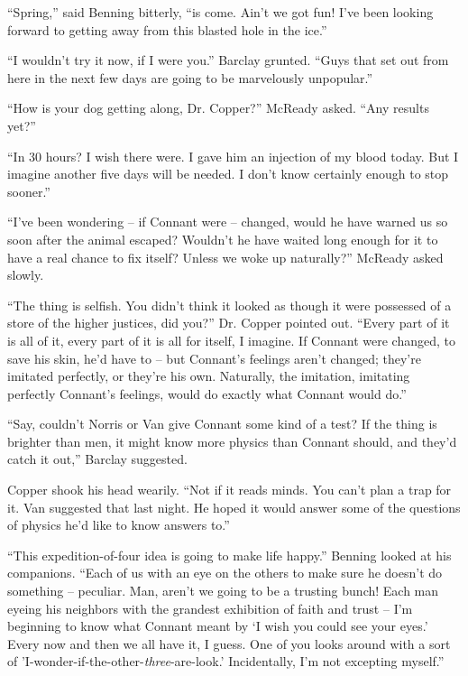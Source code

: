 \documentclass[ebook,oneside,11pt]{memoir}				%
\begin{document}
``Spring,'' said Benning bitterly, ``is come. Ain't we got fun! I've been looking forward to getting away from this blasted hole in the ice.''

``I wouldn't try it now, if I were you.'' Barclay grunted. ``Guys that set out from here in the next few days are going to be marvelously unpopular.''

``How is your dog getting along, Dr. Copper?'' McReady asked. ``Any results yet?''

``In 30 hours? I wish there were. I gave him an injection of my blood today. But I imagine another five days will be needed. I don't know certainly enough to stop sooner.''

``I've been wondering -- if Connant were -- changed, would he have warned us so soon after the animal escaped? Wouldn't he have waited long enough for it to have a real chance to fix itself? Unless we woke up naturally?'' McReady asked slowly.

``The thing is selfish. You didn't think it looked as though it were possessed of a store of the higher justices, did you?'' Dr. Copper pointed out. ``Every part of it is all of it, every part of it is all for itself, I imagine. If Connant were changed, to save his skin, he'd have to -- but Connant's feelings aren't changed; they're imitated perfectly, or they're his own. Naturally, the imitation, imitating perfectly Connant's feelings, would do exactly what Connant would do.''

``Say, couldn't Norris or Van give Connant some kind of a test? If the thing is brighter than men, it might know more physics than Connant should, and they'd catch it out,'' Barclay suggested.

Copper shook his head wearily. ``Not if it reads minds. You can't plan a trap for it. Van suggested that last night. He hoped it would answer some of the questions of physics he'd like to know answers to.''

``This expedition-of-four idea is going to make life happy.'' Benning looked at his companions. ``Each of us with an eye on the others to make sure he doesn't do something -- peculiar. Man, aren't we going to be a trusting bunch! Each man eyeing his neighbors with the grandest exhibition of faith and trust -- I'm beginning to know what Connant meant by `I wish you could see your eyes.' Every now and then we all have it, I guess. One of you looks around with a sort of 'I-wonder-if-the-other-\emph{three}-are-look.' Incidentally, I'm not excepting myself.''
\end{document}
